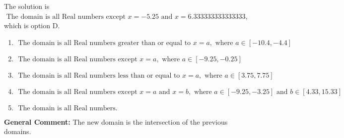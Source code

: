 \documentclass{extbook}[14pt]
\begin{document}
\begin{enumerate}
{The solution is \( \text{ The domain is all Real numbers except } x = -5.25 \text{ and } x = 6.333333333333333 \), which is option D.\begin{enumerate}[label=\Alph*.]
\item \( \text{ The domain is all Real numbers greater than or equal to } x = a, \text{ where } a \in [-10.4, -4.4] \)


\item \( \text{ The domain is all Real numbers except } x = a, \text{ where } a \in [-9.25, -0.25] \)


\item \( \text{ The domain is all Real numbers less than or equal to } x = a, \text{ where } a \in [3.75, 7.75] \)


\item \( \text{ The domain is all Real numbers except } x = a \text{ and } x = b, \text{ where } a \in [-9.25, -3.25] \text{ and } b \in [4.33, 15.33] \)


\item \( \text{ The domain is all Real numbers. } \)


\end{enumerate}

\textbf{General Comment:} The new domain is the intersection of the previous domains.
}
\end{enumerate}
\end{document}
